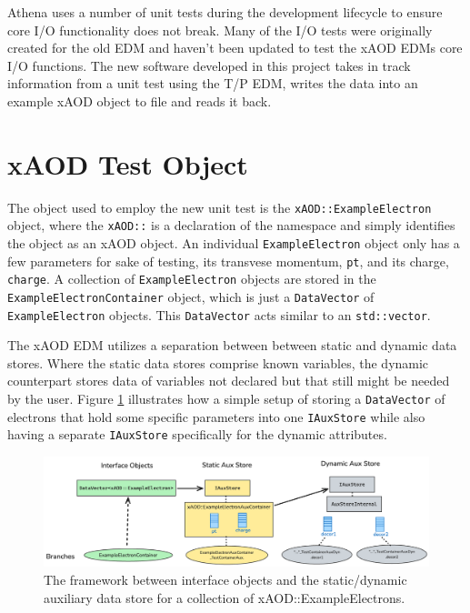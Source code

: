 Athena uses a number of unit tests during the development lifecycle to ensure core I/O functionality does not break.
Many of the I/O tests were originally created for the old EDM and haven't been updated to test the xAOD EDMs core I/O functions.
The new software developed in this project takes in track information from a unit test using the T/P EDM, writes the data into an example xAOD object to file and reads it back.


\section{xAOD Test Object}
\label{sec:Mod_utests_xAOD_object}

The object used to employ the new unit test is the \verb|xAOD::ExampleElectron| object, where the \verb|xAOD::| is a declaration of the namespace and simply identifies the object as an xAOD object.
An individual \verb|ExampleElectron| object only has a few parameters for sake of testing, its transvese momentum, \verb|pt|, and its charge, \verb|charge|.
A collection of \verb|ExampleElectron| objects are stored in the \verb|ExampleElectronContainer| object, which is just a \verb|DataVector| of \verb|ExampleElectron| objects.\cite{Buckley_2015}
This \verb|DataVector| acts similar to an \verb|std::vector|. 
 
The xAOD EDM utilizes a separation between between static and dynamic data stores.
Where the static data stores comprise known variables, the dynamic counterpart stores data of variables not declared but that still might be needed by the user. 
Figure \ref{fig:Mod_utests_aux_store} illustrates how a simple setup of storing a \verb|DataVector| of electrons that hold some specific parameters into one \verb|IAuxStore| while also having a separate \verb|IAuxStore| specifically for the dynamic attributes. 

\begin{figure}[h]
    \centering
    \includegraphics[width=\textwidth]{content/img/aux_store_better.png}
    \caption{The framework between interface objects and the static/dynamic auxiliary data store for a collection of xAOD::ExampleElectrons.}
    \label{fig:Mod_utests_aux_store}
\end{figure}





